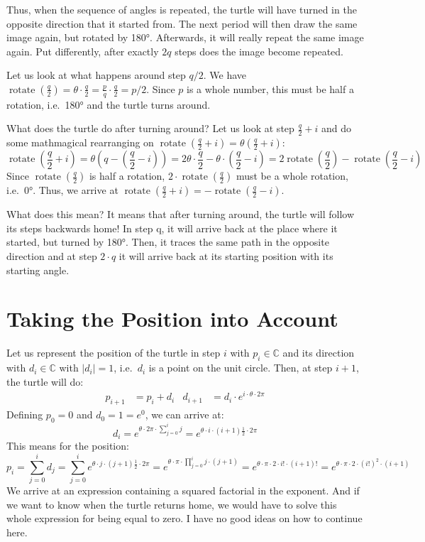 \documentclass[pdftex,a4paper]{scrartcl}
\DeclareMathOperator{\rotate}{rotate}
\begin{document}
Thus, when the sequence of angles is repeated, the turtle will have turned in the opposite direction that it started
from. The next period will then draw
the same image again, but rotated by 180°. Afterwards, it will really repeat the same image again. Put differently,
after exactly \(2q\) steps does the image become repeated.

Let us look at what happens around step \(q/2\). We have \(\rotate(\frac{q}{2})=\theta\cdot \frac{q}{2}
= \frac{p}{q} \cdot \frac{q}{2} = p/2\). Since \(p\) is a whole number, this must be half a rotation, i.e.\ 180° and the
turtle turns around.

What does the turtle do after turning around? Let us look at step \(\frac{q}{2}+i\) and do some mathmagical rearranging
on
\(
\rotate\left(\frac{q}{2}+i\right)
=\theta\left(\frac{q}{2}+i\right)
\):
\[
\rotate\left(\frac{q}{2}+i\right)
=\theta\left(q-\left(\frac{q}{2}-i\right)\right)
=2\theta\cdot \frac{q}{2} - \theta\cdot\left(\frac{q}{2}-i\right)
=2\rotate\left(\frac{q}{2}\right)-\rotate\left(\frac{q}{2}-i\right)
\]
Since \(\rotate(\frac{q}{2})\) is half a rotation, \(2\cdot\rotate(\frac{q}{2})\) must be a whole rotation, i.e.\ 0°. Thus,
we arrive at \(\rotate(\frac{q}{2}+i)=-\rotate(\frac{q}{2}-i)\).

What does this mean? It means that after turning around, the turtle will follow its steps backwards home! In step
q, it will arrive back at the place where it started, but turned by 180°. Then, it traces the same path in the opposite
direction and at step \(2\cdot q\) it will arrive back at its starting position with its starting angle.

\section{Taking the Position into Account}
Let us represent the position of the turtle in step \(i\) with \(p_i\in\mathbb{C}\) and its direction with
\(d_i\in\mathbb{C}\) with \(|d_i|=1\), i.e.\ \(d_i\) is a point on the unit circle. Then, at step \(i+1\), the turtle
will do:
\begin{align*}
p_{i+1} &= p_i + d_i &
d_{i+1} &= d_i \cdot e^{i\cdot \theta\cdot 2\pi}
\end{align*}
Defining \(p_0=0\) and \(d_0=1=e^0\), we can arrive at:
\[
d_i = e^{\theta\cdot 2\pi\cdot \sum_{j=0}^i j}
= e^{\theta\cdot i\cdot(i+1)\frac{1}{2}\cdot 2\pi}
\]
This means for the position:
\[
p_i = \sum_{j=0}^i d_j
= \sum_{j=0}^i e^{\theta\cdot j\cdot(j+1)\frac{1}{2}\cdot 2\pi}
= e^{\theta\cdot \pi\cdot\prod_{j=0}^i j\cdot (j+1) }
= e^{\theta\cdot \pi\cdot 2\cdot i! \cdot (i+1)! }
= e^{\theta\cdot \pi\cdot 2\cdot (i!)^2 \cdot (i+1) }
\]
We arrive at an expression containing a squared factorial in the exponent. And if we want to know when the turtle
returns home, we would have to solve this whole expression for being equal to zero. I have no good ideas on how to
continue here.
\end{document}
